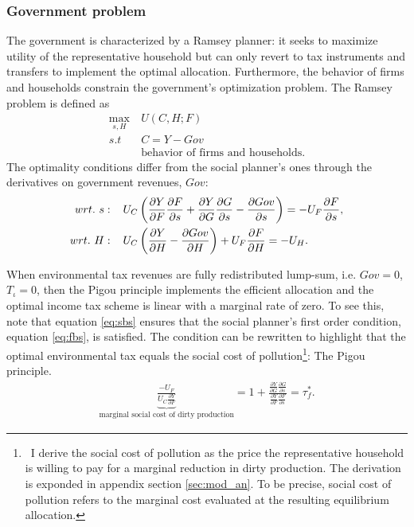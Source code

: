 \subsubsection{Government problem}\label{subsec:Rams}
The government is characterized by a Ramsey planner: it seeks to maximize utility of the representative household but can only revert to tax instruments and transfers to implement the optimal allocation. Furthermore, the behavior of firms and households constrain the government's optimization problem. 
The Ramsey problem is defined as
\begin{align}
\underset{s, H}{\max}\ & U(C,H; F)\\ s.t\ \ & C=Y-Gov\\ & \text{behavior of firms and households}.
\end{align}
The optimality conditions differ from the social planner's ones through the derivatives on government revenues, $Gov$:
\begin{align}
wrt.\ s:\hspace{4mm} & U_C\left(\frac{\partial Y}{\partial F}\frac{\partial F}{\partial s}+\frac{\partial Y}{\partial G}\frac{\partial G}{\partial s}-\frac{\partial Gov}{ \partial s}\right)=-U_F\frac{\partial F}{\partial s}, \label{eq:sbs}
\\
wrt.\ H:\hspace{4mm} & U_C\left(\frac{\partial Y}{\partial H}-\frac{\partial Gov}{\partial H}\right)+U_F\frac{\partial F}{\partial H}=-U_H\label{eq:sbh}. 
\end{align}

When environmental tax revenues are fully redistributed lump-sum, i.e. $Gov=0$, $T_\iota=0$, then the Pigou principle implements the efficient allocation and the optimal income tax scheme is linear with a marginal rate of zero. 
To see this, note that equation \ref{eq:sbs} ensures that the social planner's first order condition, equation \ref{eq:fbs}, is satisfied. 
The condition can be rewritten to highlight that the optimal environmental tax equals the social cost of pollution\footnote{\ I derive the social cost of pollution as the price the representative household is willing to pay for a marginal reduction in dirty production. The derivation is exponded in appendix section \ref{sec:mod_an}. To be precise, social cost of pollution refers to the marginal cost evaluated at the resulting equilibrium allocation.}: The Pigou principle. 
\begin{align}
\underbrace{\frac{-U_F}{U_C\frac{\partial Y}{\partial F}}}_{\text{marginal social cost of dirty production}}=1+\frac{\frac{\partial Y}{\partial G}\frac{\partial G}{\partial s}}{\frac{\partial Y}{\partial F}\frac{\partial F}{\partial s}}=\tau^*_f.
\end{align}

